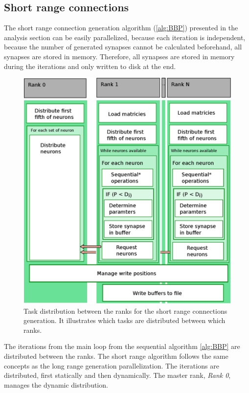 \subsection{Short range connections}
The short range connection generation algorithm (\ref{alg:BBP}) presented in the analysis section can be easily parallelized,
because each iteration is independent, because the number of generated synapses cannot be calculated beforehand, all synapses are stored in memory.
Therefore, all synapses are stored in memory during the iterations and only written to disk 
at the end.
\begin{figure}[ht!]
\centering
\includegraphics[scale=0.5]{pictures/shortRange_parallelAlg.eps}
\caption{Task distribution between the ranks for the short range connections generation.
It illustrates which tasks are distributed between which ranks.}
\label{fig:shortrangeparallel}
\end{figure}
The iterations from the main loop from the sequential algorithm \ref{alg:BBP} are distributed between the ranks.
The short range algorithm follows the same concepts as the long range generation parallelization.
The iterations are distributed, first statically and then dynamically.
The master rank, \emph{Rank 0}, manages the dynamic distribution.
